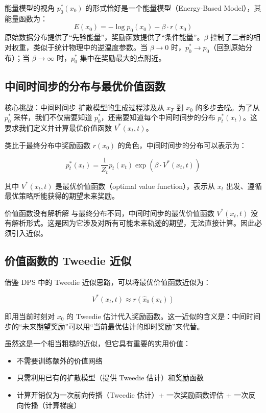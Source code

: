 \documentclass[a4paper]{article}
\begin{document}
\begin{knowledgebox}{能量模型的视角}
$p_0^*(x_0)$ 的形式恰好是一个能量模型（Energy-Based Model），其能量函数为：
$$E(x_0) = -\log p_0(x_0) - \beta \cdot r(x_0)$$
原始数据分布提供了``先验能量''，奖励函数提供了``条件能量''。$\beta$ 控制了二者的相对权重，类似于统计物理中的逆温度参数。当 $\beta \to 0$ 时，$p_0^* \to p_0$（回到原始分布）；当 $\beta \to \infty$ 时，$p_0^*$ 集中在奖励最大的点附近。
\end{knowledgebox}

\subsection{中间时间步的分布与最优价值函数}

\begin{importantbox}{核心挑战：中间时间步}
扩散模型的生成过程涉及从 $x_T$ 到 $x_0$ 的多步去噪。为了从 $p_0^*$ 采样，我们不仅需要知道 $p_0^*$，还需要知道每个中间时间步的分布 $p_t^*(x_t)$。这要求我们定义并计算最优价值函数 $V^*(x_t, t)$。
\end{importantbox}

类比于最终分布中奖励函数 $r(x_0)$ 的角色，中间时间步的分布可以表示为：

$$p_t^*(x_t) = \frac{1}{Z_t} p_t(x_t) \exp(\beta \cdot V^*(x_t, t))$$

其中 $V^*(x_t, t)$ 是最优价值函数（optimal value function），表示从 $x_t$ 出发、遵循最优策略所能获得的期望未来奖励。

\begin{warningbox}{价值函数没有解析解}
与最终分布不同，中间时间步的最优价值函数 $V^*(x_t, t)$ 没有解析形式。这是因为它涉及对所有可能未来轨迹的期望，无法直接计算。因此必须引入近似。
\end{warningbox}

\subsection{价值函数的 Tweedie 近似}

借鉴 DPS 中的 Tweedie 近似思路，可以将最优价值函数近似为：

$$V^*(x_t, t) \approx r(\hat{x}_0(x_t))$$

即用当前时刻对 $x_0$ 的 Tweedie 估计代入奖励函数。这一近似的含义是：中间时间步的``未来期望奖励''可以用``当前最优估计的即时奖励''来代替。

虽然这是一个相当粗糙的近似，但它具有重要的实用价值：

\begin{itemize}
    \item 不需要训练额外的价值网络
    \item 只需利用已有的扩散模型（提供 Tweedie 估计）和奖励函数
    \item 计算开销仅为一次前向传播（Tweedie 估计）+ 一次奖励函数评估 + 一次反向传播（计算梯度）
\end{itemize}
\end{document}
